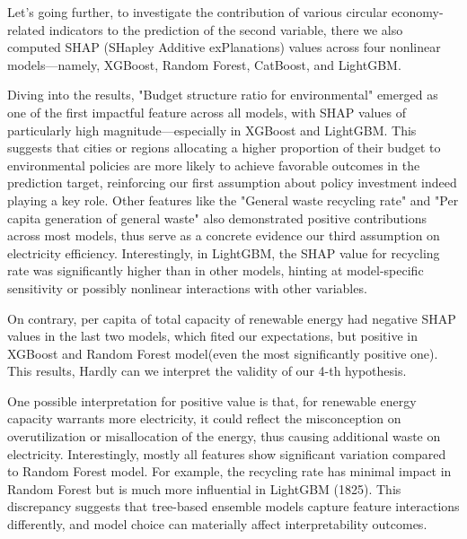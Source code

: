 \documentclass{article}
\begin{document}
Let's going further, to investigate the contribution of various circular economy-related indicators to the prediction of the second variable, there we also computed SHAP (SHapley Additive exPlanations) values across four nonlinear models—namely, XGBoost, Random Forest, CatBoost, and LightGBM. 

Diving into the results, "Budget structure ratio for environmental" emerged as one of the first impactful feature across all models, with SHAP values of particularly high magnitude—especially in XGBoost and LightGBM. 
This suggests that cities or regions allocating a higher proportion of their budget to environmental policies are more likely to achieve favorable outcomes in the prediction target, reinforcing our first assumption about policy investment indeed playing a key role.
Other features like the "General waste recycling rate" and "Per capita generation of general waste" also demonstrated positive contributions across most models, thus serve as a concrete evidence our third assumption on electricity efficiency. Interestingly, in LightGBM, the SHAP value for recycling rate was significantly higher than in other models, hinting at model-specific sensitivity or possibly nonlinear interactions with other variables.


On contrary, per capita of total capacity of renewable energy had negative SHAP values in the last two models, which fited our expectations, but positive in XGBoost and Random Forest model(even the most significantly positive one). 
This results, Hardly can we interpret the validity of our 4-th hypothesis. 

One possible interpretation for positive value is that, for renewable energy capacity warrants more electricity, it could reflect the misconception on overutilization or misallocation of the energy, thus causing additional waste on electricity.
Interestingly, mostly all features show significant variation compared to Random Forest model.  
For example, the recycling rate has minimal impact in Random Forest but is much more influential in LightGBM (1825). 
This discrepancy suggests that tree-based ensemble models capture feature interactions differently, and model choice can materially affect interpretability outcomes.
\end{document}
